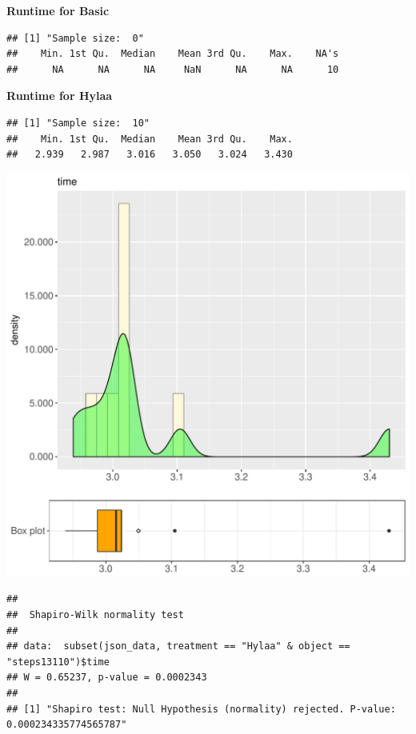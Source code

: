 \documentclass{article}\usepackage[]{graphicx}\usepackage[]{color}
\makeatletter
\def\maxwidth{ %
  \ifdim\Gin@nat@width>\linewidth
    \linewidth
  \else
    \Gin@nat@width
  \fi
}
\newenvironment{kframe}{%
 \def\at@end@of@kframe{}%
 \ifinner\ifhmode%
  \def\at@end@of@kframe{\end{minipage}}%
  \begin{minipage}{\columnwidth}%
 \fi\fi%
 \def\FrameCommand##1{\hskip\@totalleftmargin \hskip-\fboxsep
 \colorbox{shadecolor}{##1}\hskip-\fboxsep
     \hskip-\linewidth \hskip-\@totalleftmargin \hskip\columnwidth}%
 \MakeFramed {\advance\hsize-\width
   \@totalleftmargin\z@ \linewidth\hsize
   \@setminipage}}%
 {\par\unskip\endMakeFramed%
 \at@end@of@kframe}
\newenvironment{knitrout}{}{} %
\makeatother
\begin{document}
 \textbf{Runtime for Basic}
\begin{knitrout}
\color{fgcolor}\begin{kframe}
\begin{verbatim}
## [1] "Sample size:  0"
##    Min. 1st Qu.  Median    Mean 3rd Qu.    Max.    NA's 
##      NA      NA      NA     NaN      NA      NA      10
\end{verbatim}
\end{kframe}
\end{knitrout}
 \textbf{Runtime for Hylaa}
\begin{knitrout}
\color{fgcolor}\begin{kframe}
\begin{verbatim}
## [1] "Sample size:  10"
##    Min. 1st Qu.  Median    Mean 3rd Qu.    Max. 
##   2.939   2.987   3.016   3.050   3.024   3.430
\end{verbatim}
\end{kframe}
\includegraphics[width=\maxwidth]{figure/RH3_Hylaa_steps13110-1} 
\begin{kframe}\begin{verbatim}
## 
## 	Shapiro-Wilk normality test
## 
## data:  subset(json_data, treatment == "Hylaa" & object == "steps13110")$time
## W = 0.65237, p-value = 0.0002343
## 
## [1] "Shapiro test: Null Hypothesis (normality) rejected. P-value: 0.000234335774565787"
\end{verbatim}
\end{kframe}
\end{knitrout}
  
\end{document}
